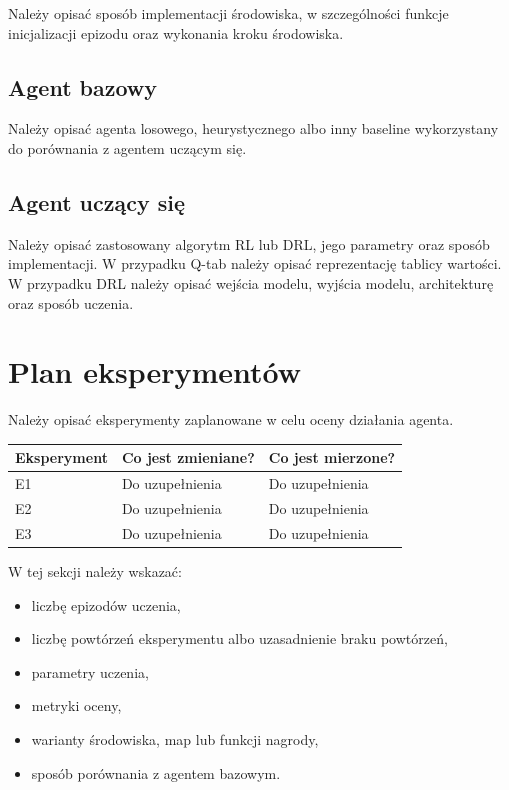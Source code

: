 \documentclass[12pt]{article}
\begin{document}
Należy opisać sposób implementacji środowiska, w szczególności funkcje inicjalizacji epizodu oraz wykonania kroku środowiska.

\subsection{Agent bazowy}

Należy opisać agenta losowego, heurystycznego albo inny baseline wykorzystany do porównania z agentem uczącym się.

\subsection{Agent uczący się}

Należy opisać zastosowany algorytm RL lub DRL, jego parametry oraz sposób implementacji. W przypadku Q-tab należy opisać reprezentację tablicy wartości. W przypadku DRL należy opisać wejścia modelu, wyjścia modelu, architekturę oraz sposób uczenia.

\section{Plan eksperymentów}

Należy opisać eksperymenty zaplanowane w celu oceny działania agenta.

\begin{center}
\begin{tabular}{p{}p{}p{}}
\toprule
Eksperyment & Co jest zmieniane? & Co jest mierzone? \\
\midrule
E1 & Do uzupełnienia & Do uzupełnienia \\
E2 & Do uzupełnienia & Do uzupełnienia \\
E3 & Do uzupełnienia & Do uzupełnienia \\
\bottomrule
\end{tabular}
\end{center}

W tej sekcji należy wskazać:
\begin{itemize}
    \item liczbę epizodów uczenia,
    \item liczbę powtórzeń eksperymentu albo uzasadnienie braku powtórzeń,
    \item parametry uczenia,
    \item metryki oceny,
    \item warianty środowiska, map lub funkcji nagrody,
    \item sposób porównania z agentem bazowym.
\end{itemize}
\end{document}
